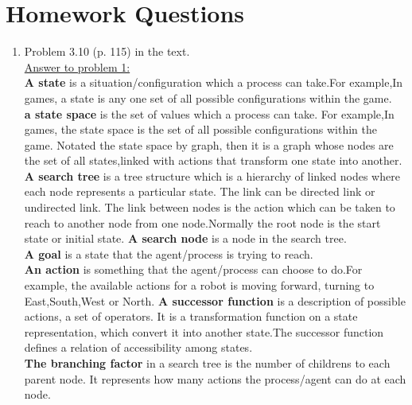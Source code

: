 \documentclass{article}
\begin{document}
\section*{Homework Questions}
\begin{enumerate}
\item Problem 3.10 (p. 115) in the text.\\
\underline{Answer to problem 1:}\\
\textbf{A state}  is a situation/configuration which a process can take.For example,In games, a state is any one set of all possible configurations within the game.\\
\textbf{a state space} is the set of values which a process can take. For example,In games, the state space is the set of all possible configurations within the game. Notated the state space by graph, then it is a graph whose nodes are the set of all states,linked with actions that transform one state into another.\\
\textbf{A search tree} is a tree structure which is a hierarchy of linked nodes where each node represents a particular state. The link can be directed link or undirected link. The link between nodes is the action which can be taken to reach to another node from one node.Normally the root node is the start state or initial state.
\textbf{A search node} is a node in the search tree.\\
\textbf{A goal} is a state that the agent/process is trying to reach.\\
\textbf{An action} is something that the agent/process can choose to do.For example, the available actions for a robot is moving forward, turning to East,South,West or North.
\textbf{A successor function} is a description of possible actions, a set of operators. It is a transformation function on a state representation, which convert it into another state.The successor function defines a relation of accessibility among states.\\
\textbf{The branching factor} in a search tree is the number of childrens to each parent node. It represents how many actions the process/agent can do at each node.\\


\end{enumerate}
\end{document}
